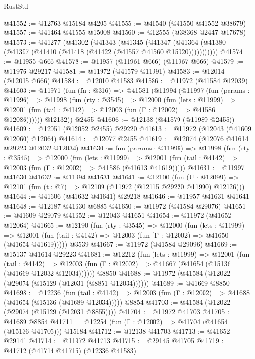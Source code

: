 \begin{lexlean}{RustStd}
\begin{coremodule}
@41552 := @12763 @15184 @4205
@41555 := @41540 (@41550 @41552 @38679)
@41557 := @41464 @41555 @15008
@41560 := @12555 (@38368 @2447 @17678)
@41573 := @41277
    (@41302
      (@41343
        (@41345
          (@41347 (@41364 (@41380 (@41397 (@41410 (@41418 (@41422 (@41557 @41560 @15020)))))))))))
@41574 := @11955 @666
@41578 := @11957 (@11961 @666) (@11967 @666)
@41579 := @11976 @29217
@41581 := @11972 (@41579 @11991)
@41583 := @12014 (@12015 @666)
@41584 := @12010 @41583
@41586 := @11972 (@41584 @12039)
@41603 := @11971
    (fun (fn : @316) =>
    @41581
      (@11994
        (@11997
          (fun (params : @11996) =>
          @11998
            (fun (rty : @3545) =>
            @12000
              (fun (lets : @11999) =>
              @12001 (fun (tail : @4142) => @12003 (fun (Γ : @12002) => @41586 @12086))))))
        @12132))
    @2455
@41606 := @12138 (@41579 (@11989 @2455))
@41609 := @12051 (@12052 @2455) @29220
@41613 := @11972 (@12043 (@41609 @12060) @12064)
@41614 := @12077 @2455
@41619 := @12074 (@12076 @41614 @29223 @12032 @12034)
@41630 := fun (params : @11996) =>
  @11998
    (fun (rty : @3545) =>
    @12000
      (fun (lets : @11999) =>
      @12001 (fun (tail : @4142) => @12003 (fun (Γ : @12002) => @41586 (@41613 @41619)))))
@41631 := @11997 @41630
@41632 := @11994 @41631
@41641 := @12100
    (fun (U : @12099) => @12101 (fun (t : @7) => @12109 (@11972 (@12115 @29220 @11990) @12126)))
@41644 := @41606 (@41632 @41641) @29218
@41646 := @11957 @41631 @41641
@41648 := @12187 @41630 @6885
@41650 := @11972 (@41584 @29076)
@41651 := @41609 @29079
@41652 := @12043 @41651
@41654 := @11972 (@41652 @12064)
@41665 := @12190
    (fun (rty : @3545) =>
    @12000
      (fun (lets : @11999) =>
      @12001 (fun (tail : @4142) => @12003 (fun (Γ : @12002) => @41650 (@41654 @41619)))))
    @3539
@41667 := @11972 (@41584 @29096)
@41669 := @15137 @41614 @29223
@41681 := @12212
    (fun (lets : @11999) =>
    @12001
      (fun (tail : @4142) =>
      @12003 (fun (Γ : @12002) => @41667 (@41654 (@15136 (@41669 @12032 @12034))))))
    @8850
@41688 := @11972 (@41584 (@12022 (@29074 (@15129 (@12031 (@8851 @12034))))))
@41689 := @41669 @8850
@41698 := @12236
    (fun (tail : @4142) => @12003 (fun (Γ : @12002) => @41688 (@41654 (@15136 (@41689 @12034)))))
    @8854
@41703 := @41584 (@12022 (@29074 (@15129 (@12031 @8855))))
@41704 := @11972 @41703
@41705 := @41689 @8854
@41711 := @12254 (fun (Γ : @12002) => @41704 (@41654 (@15136 @41705))) @15184
@41712 := @12138 @41703
@41713 := @41652 @29141
@41714 := @11972 @41713
@41715 := @29145 @41705
@41719 := @41712 (@41714 @41715) (@12336 @41583)

\end{coremodule}
\end{lexlean}
